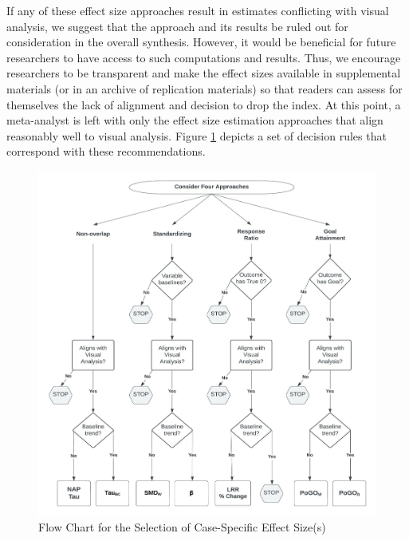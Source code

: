 \documentclass[
]{book}
\begin{document}
If any of these effect size approaches result in estimates conflicting with visual analysis, we suggest that the approach and its results be ruled out for consideration in the overall synthesis. However, it would be beneficial for future researchers to have access to such computations and results. Thus, we encourage researchers to be transparent and make the effect sizes available in supplemental materials (or in an archive of replication materials) so that readers can assess for themselves the lack of alignment and decision to drop the index. At this point, a meta-analyst is left with only the effect size estimation approaches that align reasonably well to visual analysis. Figure \ref{fig:CaseSpecificES-flowchart} depicts a set of decision rules that correspond with these recommendations.

\begin{figure}
\includegraphics[width=0.8\linewidth]{images/flowchart_CaseSpecificES} \caption{Flow Chart for the Selection of Case-Specific Effect Size(s)}\label{fig:CaseSpecificES-flowchart}
\end{figure}
\end{document}
